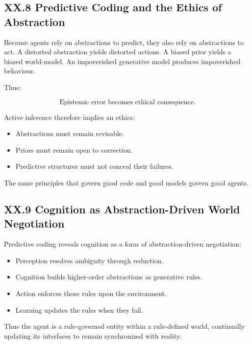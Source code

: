 \documentclass[12pt,letterpaper]{article}
\begin{document}
\subsection{XX.8 Predictive Coding and the Ethics of Abstraction}

Because agents rely on abstractions to predict, they also rely on abstractions to act.  
A distorted abstraction yields distorted actions.  
A biased prior yields a biased world-model.  
An impoverished generative model produces impoverished behaviour.

Thus:

\[
\text{Epistemic error becomes ethical consequence.}
\]

Active inference therefore implies an ethics:

\begin{itemize}
    \item Abstractions must remain revisable.
    \item Priors must remain open to correction.
    \item Predictive structures must not conceal their failures.
\end{itemize}

The same principles that govern good code and good models govern good agents.

\subsection{XX.9 Cognition as Abstraction-Driven World Negotiation}

Predictive coding reveals cognition as a form of abstraction-driven negotiation:

\begin{itemize}
    \item Perception resolves ambiguity through reduction.
    \item Cognition builds higher-order abstractions as generative rules.
    \item Action enforces those rules upon the environment.
    \item Learning updates the rules when they fail.
\end{itemize}

Thus the agent is a rule-governed entity within a rule-defined world, continually updating its interfaces to remain synchronized with reality.
\end{document}
